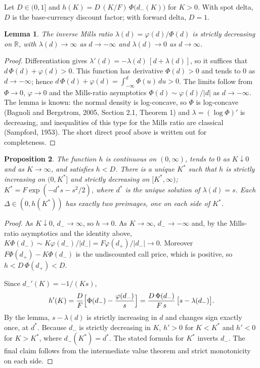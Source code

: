 \documentclass[11pt]{article}
\newtheorem{proposition}{Proposition}
\newtheorem{lemma}[proposition]{Lemma}
\theoremstyle{remark}
\begin{document}
Let $D\in(0,1]$ and $h(K)=D\,(K/F)\,\Phi\bigl(d_-(K)\bigr)$ for $K>0$. With spot delta, $D$ is the base-currency discount factor; with forward delta, $D=1$.

\begin{lemma}
The inverse Mills ratio $\lambda(d)=\varphi(d)/\Phi(d)$ is strictly decreasing on $\mathbb{R}$, with $\lambda(d)\to\infty$ as $d\to-\infty$ and $\lambda(d)\to0$ as $d\to\infty$.
\end{lemma}

\begin{proof}
Differentiation gives $\lambda'(d)=-\lambda(d)\,[d+\lambda(d)]$, so it suffices that $d\,\Phi(d)+\varphi(d)>0$. This function has derivative $\Phi(d)>0$ and tends to $0$ as $d\to-\infty$; hence $d\,\Phi(d)+\varphi(d)=\int_{-\infty}^d\Phi(u)\,du>0$. The limits follow from $\Phi\to0$, $\varphi\to0$ and the Mills-ratio asymptotics $\Phi(d)\sim\varphi(d)/|d|$ as $d\to-\infty$. The lemma is known: the normal density is log-concave, so $\Phi$ is log-concave (Bagnoli and Bergstrom, 2005, Section 2.1, Theorem 1) and $\lambda=(\log\Phi)'$ is decreasing, and inequalities of this type for the Mills ratio are classical (Sampford, 1953). The short direct proof above is written out for completeness.
\end{proof}

\begin{proposition}
The function $h$ is continuous on $(0,\infty)$, tends to $0$ as $K\downarrow0$ and as $K\to\infty$, and satisfies $h<D$. There is a unique $K^*$ such that $h$ is strictly increasing on $(0,K^*]$ and strictly decreasing on $[K^*,\infty)$; $K^*=F\exp(-d^*s-s^2/2)$, where $d^*$ is the unique solution of $\lambda(d)=s$. Each $\Delta\in(0,h(K^*))$ has exactly two preimages, one on each side of $K^*$.
\end{proposition}

\begin{proof}
As $K\downarrow0$, $d_-\to\infty$, so $h\to0$. As $K\to\infty$, $d_-\to-\infty$ and, by the Mills-ratio asymptotics and the identity above, $K\Phi(d_-)\sim K\varphi(d_-)/|d_-|=F\varphi(d_+)/|d_-|\to0$. Moreover $F\Phi(d_+)-K\Phi(d_-)$ is the undiscounted call price, which is positive, so $h<D\,\Phi(d_+)<D$.

Since $d_-'(K)=-1/(Ks)$,
\[
h'(K)=\frac{D}{F}\Bigl[\Phi(d_-)-\frac{\varphi(d_-)}{s}\Bigr]=\frac{D\,\Phi(d_-)}{F\,s}\,\bigl[s-\lambda(d_-)\bigr].
\]
By the lemma, $s-\lambda(d)$ is strictly increasing in $d$ and changes sign exactly once, at $d^*$. Because $d_-$ is strictly decreasing in $K$, $h'>0$ for $K<K^*$ and $h'<0$ for $K>K^*$, where $d_-(K^*)=d^*$. The stated formula for $K^*$ inverts $d_-$. The final claim follows from the intermediate value theorem and strict monotonicity on each side.
\end{proof}
\end{document}
